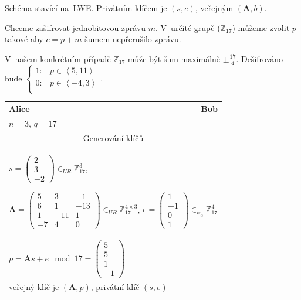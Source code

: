 Schéma stavící na~LWE.
Privátním klíčem je $(s, e)$, veřejným $(\textbf{A}, b)$.

Chceme zašifrovat jednobitovou zprávu $m$.
V~určité grupě ($\mathbb{Z}_{17}$) můžeme zvolit $p$ takové aby $c = p+m$ šumem nepřerušilo zprávu.

V~našem konkrétním případě $\mathbb{Z}_{17}$ může být šum maximálně $\pm \frac{17}{4}$.
Dešifrováno bude $\begin{cases}
1: & p \in \left<5, 11\right> \\
0: & p \in \left<-4, 3\right> \\
\end{cases}$.

\begin{table}[ht]
    \centering
    \onehalfspacing
    \begin{tabular}{lr}
    \textbf{Alice} & \textbf{Bob} \\
    $n = 3$, $q = 17$ \\

    \multicolumn{2}{c}{Generování klíčů} \\
    \multicolumn{2}{l}{
    $s = \left(\begin{matrix}
    2 \\ 3 \\ -2
    \end{matrix}\right) \in_{UR} \mathbb{Z}_{17}^3$,

    $\textbf{A} = \left(\begin{matrix}
    5 & 3 & -1 \\ 6 & 1 & -13 \\ 1 & -11 & 1 \\ -7 & 4 & 0
    \end{matrix}\right) \in_{UR} \mathbb{Z}_{17}^{4 \times 3}$,
    $e = \left(\begin{matrix}
    1 \\ -1 \\ 0 \\ 1
    \end{matrix}\right) \in_{\psi_\alpha} \mathbb{Z}_{17}^4$
    \hspace*{5em}
    } \\
    $p = \textbf{A}s + e \mod {17} = \left(\begin{matrix}
    5 \\ 5 \\ 1 \\ -1
    \end{matrix}\right)$ \\
    veřejný klíč je $(\textbf{A}, p)$, privátní klíč $(s, e)$ \\


\end{tabular}
\end{table}
